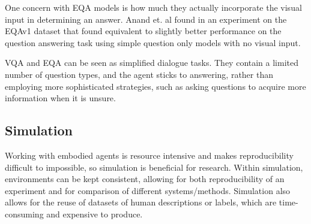 \documentclass{article}
\begin{document}
One concern with EQA models is how much they actually incorporate the visual input in determining an answer. Anand et. al found in an experiment on the EQAv1 dataset that found equivalent to slightly better performance on the question answering task using simple question only models with no visual input\cite{blindfolded}.




VQA and EQA can be seen as simplified dialogue tasks. They contain a limited number of question types, and the agent sticks to answering, rather than employing more sophisticated strategies, such as asking questions to acquire more information when it is unsure. 

\subsection{Simulation}
Working with embodied agents is resource intensive and makes reproducibility difficult to impossible, so simulation is beneficial for research. Within simulation, environments can be kept consistent, allowing for both reproducibility of an experiment and for comparison of different systems/methods. Simulation also allows for the reuse of datasets of human descriptions or labels, which are time-consuming and expensive to produce.  
\end{document}
